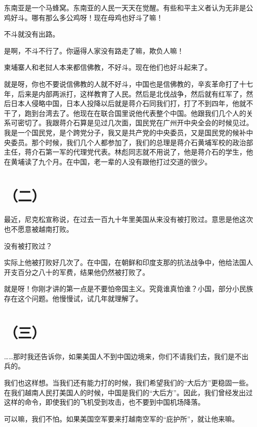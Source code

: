 东南亚是一个马蜂窝。东南亚的人民一天天在觉醒。有些和平主义者认为无非是公鸡好斗。哪有那么多公鸡呀！现在母鸡也好斗了嘛！

不斗就没有出路。

是啊，不斗不行了。你逼得人家没有路走了嘛，欺负人嘛！

柬埔寨人和老挝人本来都信佛教，不好斗。现在他们也好斗起来了。

就是呀，你也不要说信佛教的人就不好斗，中国也是信佛教的，辛亥革命打了十七年，后来是内部两派打，这样教育了人民。然后是北伐战争，然后就有红军了，然后日本人侵略中国，日本人投降以后就是蒋介石同我们打，打了不到四年，他就不干了，跑到台湾去了。他现在在联合国里说他代表整个中国。他跟我们几个人的关系可密切了。我跟蒋介石算是见过几次面，国民党在广州开中央全会的时候见过。我是一个国民党，是个跨党分子，我又是共产党的中央委员，又是国民党的候补中央委员。那个时候，我们几个人都参加了，我们的总理是蒋介石黄埔军校的政治部主任，蒋介石第一军的代理党代表。林彪同志就不用说了，他是蒋介石的学生，他在黄埔读了九个月。在中国，老一辈的人没有跟他打过交道的很少。

\section*{（二）}

最近，尼克松宣称说，在过去一百九十年里美国从来没有被打败过。意思是他这次也不愿意被越南打败。

没有被打败过？

实际上他被打败好几次了。在中国，在朝鲜和印度支那的抗法战争中，他给法国人开支百分之八十的军费，结果他仍然被打败了。

就是呀！你刚才讲的第一点是不要怕帝国主义。究竟谁真怕谁？小国，部分小民族存在这个问题。他慢慢试，试几年就理解了。

\section*{（三）}

……那时我还告诉你，如果美国人不到中国边境来，你们不请我们去，我们是不出兵的。

我们也这样想。当我们还有能力打的时候，我们希望我们的“大后方”更稳固一些。在我们越南人民打美国人的时候，中国是我们的“大后方”。因此，我们曾经发出过这样的命令，即使我们的飞机受到攻击，也不要到中国机场降落。

可以嘛，我们不怕。如果美国空军要来打越南空军的“庇护所”，就让他来嘛。


